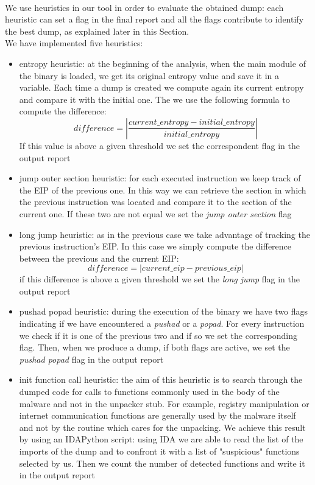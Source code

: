 \paragraph{}
We use heuristics in our tool in order to evaluate the obtained dump: each heuristic can set a flag in the final report and all the flags contribute to identify the best dump, as explained later in this Section.\\
We have implemented five heuristics:
\begin{itemize}
\item entropy heuristic: at the beginning of the analysis, when the main module of the binary is loaded, we get its original entropy value and save it in a variable. Each time a dump is created we compute again its current entropy and compare it with the initial one. The we use the following formula to compute the difference:
\begin{equation}
difference = \left|\frac{current\_entropy - initial\_entropy}{initial\_entropy}\right|
\end{equation}
If this value is above a given threshold we set the correspondent flag in the output report
\item jump outer section heuristic: for each executed instruction we keep track of the EIP of the previous one. In this way we can retrieve the section in which the previous instruction was located and compare it to the section of the current one. If these two are not equal we set the \textit{jump outer section} flag
\item long jump heuristic: as in the previous case we take advantage of tracking the previous instruction's EIP. In this case we simply compute the difference between the previous and the current EIP: 
\begin{equation}
difference = \left|current\_eip - previous\_eip\right|
\end{equation}
if this difference is above a given threshold we set the \textit{long jump} flag in the output report
\item pushad popad heuristic: during the execution of the binary we have two flags indicating if we have encountered a \textit{pushad} or a \textit{popad}. For every instruction we check if it is one of the previous two and if so we set the corresponding flag. Then, when we produce a dump, if both flags are active, we set the \textit{pushad popad} flag in the output report
\item init function call heuristic: the aim of this heuristic is to search through the dumped code for calls to functions commonly used in the body of the malware and not in the unpacker stub. For example, registry manipulation or internet communication functions are generally used by the malware itself and not by the routine which cares for the unpacking. We achieve this result by using an IDAPython script: using IDA we are able to read the list of the imports of the dump and to confront it with a list of "suspicious" functions selected by us. Then we count the number of detected functions and write it in the output report
\end{itemize} 

